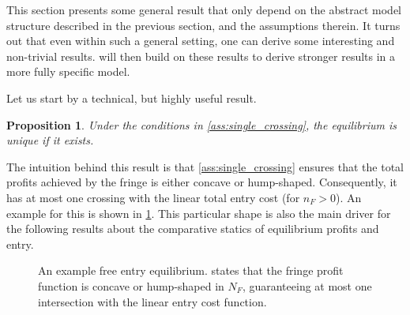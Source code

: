 \documentclass[a4paper]{article}
\newtheorem{proposition}{Proposition}
\begin{document}
This section presents some general result that only depend on the abstract model structure described in the previous section, and the assumptions therein.
It turns out that even within such a general setting, one can derive some interesting and non-trivial results.
 will then build on these results to derive stronger results in a more fully specific model.

Let us start by a technical, but highly useful result.
\begin{proposition}
    \label{prop:unique_equilibrium}
    Under the conditions in \cref{ass:single_crossing}, the equilibrium is unique if it exists.
\end{proposition}
The intuition behind this result is that \cref{ass:single_crossing} ensures that the total profits achieved by the fringe is either concave or hump-shaped.
Consequently, it has at most one crossing with the linear total entry cost (for $n_F > 0$).
An example for this is shown in \cref{fig:equilibrium}.
This particular shape is also the main driver for the following results about the comparative statics of equilibrium profits and entry.

\begin{figure}[ht]
    \centering
    \caption{An example free entry equilibrium.  states that the fringe profit function is concave or hump-shaped in $N_F$, guaranteeing at most one intersection with the linear entry cost function.}
    \label{fig:equilibrium}
\end{figure}
\end{document}
